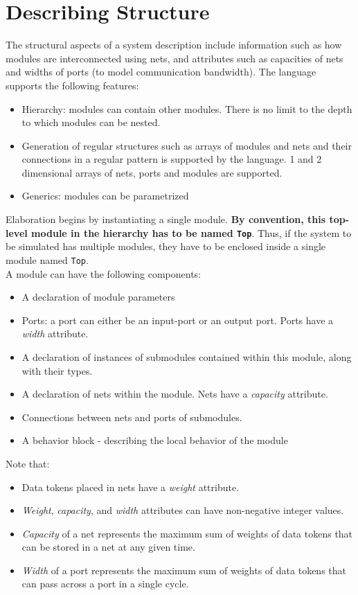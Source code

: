 \documentclass[12pt,a4paper]{report}
\begin{document}
	\section{Describing Structure}
	
	The structural aspects of a system description include information such as
	how modules are interconnected using nets, and attributes such as 
	capacities of nets and widths of ports (to model communication bandwidth).
	The language supports the following features:
	\begin{itemize}
	\item Hierarchy: modules can contain other modules. There is no limit 
	to the depth to which modules can be nested.
	\item Generation of regular structures such as arrays of modules and nets
	and their connections in a regular pattern is supported by the language.
	1 and 2 dimensional arrays of nets, ports and modules are supported.
	\item Generics: modules can be parametrized
	\end{itemize}

	Elaboration begins by instantiating a single module.  \textbf{By
	convention, this top-level module in the hierarchy has to be named
	\texttt{Top}}.  Thus, if the system to be simulated has multiple
	modules, they have to be enclosed inside a single module named \texttt{Top}.\\

	A module can have the following components:
	\begin{itemize}
	\item A declaration of module parameters
	\item Ports: a port can either be an input-port or an output port.
	Ports have a \emph{width} attribute.
	\item A declaration of instances of submodules contained within this module, along with their types.
	\item A declaration of nets within the module. Nets have a \emph{capacity} attribute.
	\item Connections between nets and ports of submodules.
	\item A behavior block -  describing the local behavior of the module
	\end{itemize}
	
	Note that:
	{\renewcommand{\labelitemi}{$\triangleright$}
	\begin{itemize}
	\item Data tokens placed in nets have a \emph{weight} attribute. 
	\item \emph{Weight}, \emph{capacity}, and \emph{width} attributes can have non-negative integer values.
	\item \emph{Capacity} of a net represents the maximum 
	sum of weights of data tokens that can be stored in a net at any given time.
	\item \emph{Width} of a port represents the maximum sum of weights of data tokens that can pass across
	a port in a single cycle.
	\end{itemize}}
\end{document}
